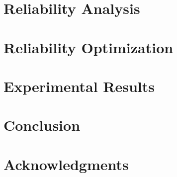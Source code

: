 \documentclass[journal]{IEEEtran}
\begin{document}
  \section{Reliability Analysis} 
  

  \section{Reliability Optimization} 
  

  \section{Experimental Results} 
  

  \section{Conclusion} 
  

  \section*{Acknowledgments}
  

  \appendix
  

  \begingroup
    \fontsize{9pt}{11pt}\selectfont
    
    
  \endgroup

  
\end{document}
